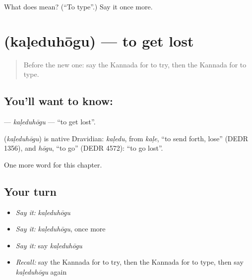 \begin{tcolorbox}[breakable,colback=teal!4,colframe=teal!35!black,title={Before you move on}]
What does   mean? (\textquotedblleft{}To type\textquotedblright{}.) Say it once more.
\end{tcolorbox}
\section[\texorpdfstring{\kn{ಕಳೆದುಹೋಗು} (kaḷeduhōgu)}{ಕಳೆದುಹೋಗು (kaḷeduhōgu)}]{ (kaḷeduhōgu) — to get lost}

\label{lesson:KA-C238-kaleduhogu}



\begin{quote}
Before the new one: say the Kannada for to try, then the Kannada for to type.
\end{quote}

\subsection*{You'll want to know: }
\textbf{} — \emph{kaḷeduhōgu} — \textquotedblleft{}to get lost\textquotedblright{}.

\begin{cousinweb}
\textbf{} (\emph{kaḷeduhōgu}) is native Dravidian: \emph{kaḷedu}, from \emph{kaḷe}, \textquotedblleft{}to send forth, lose\textquotedblright{} (DEDR 1356), and \emph{hōgu}, \textquotedblleft{}to go\textquotedblright{} (DEDR 4572): \textquotedblleft{}to go lost\textquotedblright{}.
\end{cousinweb}

\begin{grammarlens}[title={What you've built}]
One more word for this chapter.
\end{grammarlens}

\subsection*{Your turn}
\begin{itemize}
\raggedright
  \item \emph{Say it:} \emph{kaḷeduhōgu}
  \item \emph{Say it:} \emph{kaḷeduhōgu}, once more
  \item \emph{Say it:} say \emph{kaḷeduhōgu}
  \item \emph{Recall:} say the Kannada for to try, then the Kannada for to type, then say \emph{kaḷeduhōgu} again
\end{itemize}

